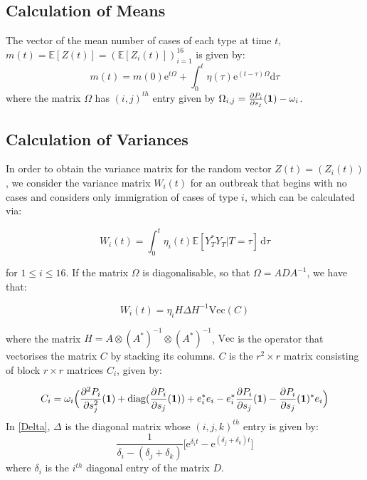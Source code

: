 \documentclass{article}
\begin{document}
\subsection{Calculation of Means}

The vector of the mean number of cases of each type at time $t$, $m(t) = {\mathbb{E}}[Z(t)] = ({\mathbb{E}}[Z_i(t)])_{i=1}^{16}$ is given by:
\begin{equation}
m(t) = m(0){\mathrm{e}}^{t\Omega} + \int_0^t \eta(\tau){\mathrm{e}}^{(t-\tau)\Omega} {\mathrm{d}}\tau 
\end{equation}
where the matrix $\Omega$ has $(i, j)^{th}$ entry given by $\Omega_{i, j} = \frac{\partial P_i}{\partial s_j}({\vb{1}}) - \omega_i$. 





\subsection{Calculation of Variances}
In order to obtain the variance matrix for the random vector $Z(t) = (Z_i(t))$, we consider the variance matrix $W_i(t)$ for an outbreak that begins with no cases and considers only immigration of cases of type $i$, which can be calculated via:

\begin{equation}
W_i(t) = \int_0^t \eta_i(t) {\mathbb{E}}[Y_T^*Y_T | T=\tau] \, {\mathrm{d}}\tau
\end{equation}

for $1 \leq i \leq 16$. If the matrix $\Omega$ is diagonalisable, so that $\Omega = ADA^{-1}$, we have that:

\begin{equation}
W_i(t) = \eta_i H\Delta H^{-1} {\mathrm{Vec}}(C) \label{Delta}
\end{equation}
 
where the matrix $H= A \otimes (A^*)^{-1} \otimes (A^*)^{-1}$, ${\mathrm{Vec}}$ is the operator that vectorises the matrix $C$ by stacking its columns. $C$ is the $r^2 \times r$ matrix consisting of block $r \times r$ matrices $C_i$, given by:

\begin{equation}
C_i = \omega_i\Big(\frac{\partial^2 P_i}{\partial s_j^2}({\vb{1}}) + {\mathrm{diag}}(\frac{\partial P_i}{\partial s_j}({\vb{1}})) + e_i^*e_i - e_i^* \frac{\partial P_i}{\partial s_j}({\vb{1}}) - \frac{\partial P_i}{\partial s_j}({\vb{1}})^*e_i\Big)
\end{equation}
In \ref{Delta}, $\Delta$ is the diagonal matrix whose $(i, j, k)^{th}$ entry is given by:
\begin{equation}
\frac{1}{\delta_i - (\delta_j + \delta_k)}\big[{\mathrm{e}}^{\delta_i t} - {\mathrm{e}}^{(\delta_j + \delta_k) t}\big] 
\end{equation}
where $\delta_i$ is the $i^{th}$ diagonal entry of the matrix $D$. 
\end{document}
